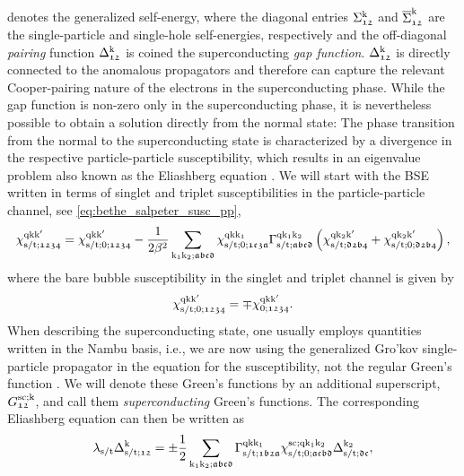 \documentclass[../../main.tex]{subfiles}
\begin{document}
denotes the generalized self-energy, where the diagonal entries $\Sigma_{\mathfrak{12}}^{\text{k}}$ and $\overline{\Sigma}_{\mathfrak{12}}^{\text{k}}$ are the single-particle and single-hole self-energies, respectively and the off-diagonal \textit{pairing} function $\Delta_{\mathfrak{12}}^{\text{k}}$ is coined the superconducting \textit{gap function}. $\Delta_{\mathfrak{12}}^{\text{k}}$ is directly connected to the anomalous propagators and therefore can capture the relevant Cooper-pairing nature of the electrons in the superconducting phase. While the gap function is non-zero only in the superconducting phase, it is nevertheless possible to obtain a solution directly from the normal state: The phase transition from the normal to the superconducting state is characterized by a divergence in the respective particle-particle susceptibility, which results in an eigenvalue problem also known as the Eliashberg equation \cite{Berges2016}. We will start with the BSE written in terms of singlet and triplet susceptibilities in the particle-particle channel, see \eqref{eq:bethe_salpeter_susc_pp},
\begin{align}
\chi^{\text{q}\text{k}\text{k}'}_{\text{s}/\text{t};\mathfrak{1234}}=\chi^{\text{q}\text{k}\text{k}'}_{\text{s}/\text{t};0;\mathfrak{1234}}-\frac{1}{2\beta^2}\sum_{\text{k}_1\text{k}_2;\mathfrak{abcd}}\chi^{\text{q}\text{k}\text{k}_1}_{\text{s}/\text{t};0;\mathfrak{1c3a}}\Gamma^{\text{q}\text{k}_1\text{k}_2}_{\text{s}/\text{t};\mathfrak{abcd}}\left (\chi^{\text{q}\text{k}_2\text{k}'}_{\text{s}/\text{t};\mathfrak{d2b4}}+\chi^{\text{q}\text{k}_2\text{k}'}_{\text{s}/\text{t};0;\mathfrak{d2b4}}\right ),
\end{align}
where the bare bubble susceptibility in the singlet and triplet channel is given by \cite{Gingras2019}
\begin{align}
	\chi^{\text{q}\text{k}\text{k}'}_{\text{s}/\text{t};0;\mathfrak{1234}}=\mp\chi^{\text{q}\text{k}\text{k}'}_{0;\mathfrak{1234}}.
\end{align}
When describing the superconducting state, one usually employs quantities written in the Nambu basis, i.e., we are now using the generalized Gro'kov single-particle propagator in the equation for the susceptibility, not the regular Green's function \cite{Nambu1950, Putzer2023}. We will denote these Green's functions by an additional superscript, $G^{\text{sc};\text{k}}_{\mathfrak{12}}$, and call them \textit{superconducting} Green's functions. The corresponding Eliashberg equation can then be written as
\begin{align}\label{eq:full_eliashberg}
	\lambda_{\text{s}/\text{t}}\Delta_{\text{s}/\text{t};\mathfrak{12}}^{\text{k}}=\pm\frac{1}{2}\sum_{\text{k}_1\text{k}_2;\mathfrak{abcd}}\Gamma^{\text{q}\text{k}\text{k}_1}_{\text{s}/\text{t};\mathfrak{1b2a}}\chi^{\text{sc};\text{q}\text{k}_1\text{k}_2}_{\text{s}/\text{t};0;\mathfrak{acbd}}\Delta_{\text{s}/\text{t};\mathfrak{dc}}^{\text{k}_2},
\end{align}
\end{document}
